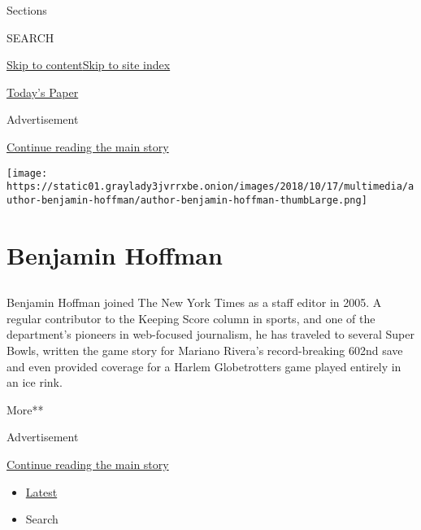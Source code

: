 Sections

SEARCH

\protect\hyperlink{site-content}{Skip to
content}\protect\hyperlink{site-index}{Skip to site index}

\href{https://myaccount.nytimes3xbfgragh.onion/auth/login?response_type=cookie\&client_id=vi}{}

\href{https://www.nytimes3xbfgragh.onion/section/todayspaper}{Today's
Paper}

Advertisement

\protect\hyperlink{after-top}{Continue reading the main story}

\texttt{[image: https://static01.graylady3jvrrxbe.onion/images/2018/10/17/multimedia/author-benjamin-hoffman/author-benjamin-hoffman-thumbLarge.png]}

\hypertarget{benjamin-hoffman}{%
\section{Benjamin Hoffman}\label{benjamin-hoffman}}

\subsection{}

Benjamin Hoffman joined The New York Times as a staff editor in 2005. A
regular contributor to the Keeping Score column in sports, and one of
the department's pioneers in web-focused journalism, he has traveled to
several Super Bowls, written the game story for Mariano Rivera's
record-breaking 602nd save and even provided coverage for a Harlem
Globetrotters game played entirely in an ice rink.

More**

Advertisement

\protect\hyperlink{after-mid1}{Continue reading the main story}

\begin{itemize}
\tightlist
\item
  \protect\hyperlink{stream-panel}{Latest}
\item
  Search
\end{itemize}

